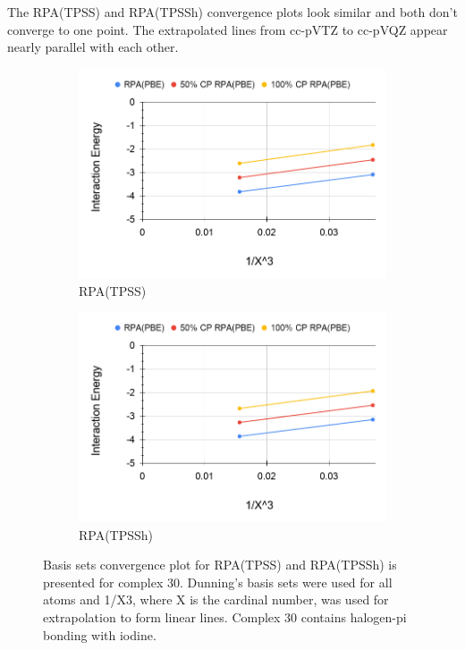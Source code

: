 \documentclass[11pt]{article}
\begin{document}
The RPA(TPSS) and RPA(TPSSh) convergence plots look similar and both don't
converge to one point. The extrapolated lines from cc-pVTZ to cc-pVQZ
appear nearly parallel with each other.

\begin{figure}[H]
  \centering
  \begin{subfigure}{.5\textwidth}
    \centering
    \includegraphics[scale=0.3]{tpss-30.png}
    \caption{RPA(TPSS)}
    \label{fig:tpss_30}
  \end{subfigure}%
  \begin{subfigure}{.5\textwidth}
    \centering
    \includegraphics[scale=0.3]{tpssh-30.png}
    \caption{RPA(TPSSh)}
    \label{fig:tpssh_30}
  \end{subfigure}
  \caption{Basis sets convergence plot for RPA(TPSS) and RPA(TPSSh) is
    presented for complex 30. Dunning's basis sets were used for all
    atoms and 1/X3, where X is the cardinal number, was used for
    extrapolation to form linear lines. Complex 30 contains halogen-pi
    bonding with iodine.}
  \label{fig:complex_30}
\end{figure}
\end{document}
